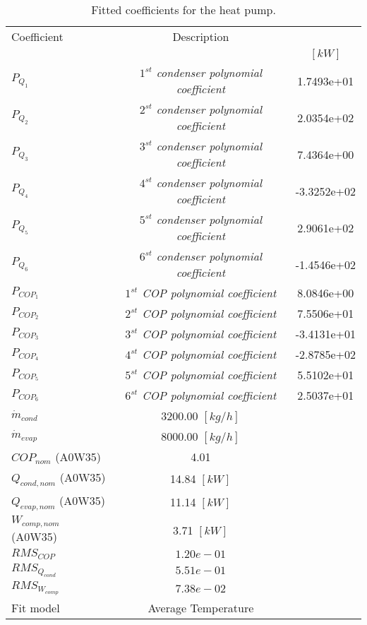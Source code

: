 \documentclass[english]{SPFShortReport}
\author{Dani Carbonell}
\begin{document}
\begin{table}[!ht]
\begin{small}
\caption{Fitted coefficients for the heat pump.}
\begin{center}
\resizebox{12cm}{!} 
{
\begin{tabular}{l | c c } 
\hline
\hline
Coefficient &Description & \\ 
 & &$[kW]$\\ 
\hline
$P_{Q_{1}}$ & \emph{$1^{st}$ condenser polynomial coefficient}  & 1.7493e+01    \\ 
$P_{Q_{2}}$ & \emph{$2^{st}$ condenser polynomial coefficient}  & 2.0354e+02    \\ 
$P_{Q_{3}}$ & \emph{$3^{st}$ condenser polynomial coefficient}  & 7.4364e+00    \\ 
$P_{Q_{4}}$ & \emph{$4^{st}$ condenser polynomial coefficient}  & -3.3252e+02    \\ 
$P_{Q_{5}}$ & \emph{$5^{st}$ condenser polynomial coefficient}  & 2.9061e+02    \\ 
$P_{Q_{6}}$ & \emph{$6^{st}$ condenser polynomial coefficient}  & -1.4546e+02    \\ 
\hline
$P_{COP_{1}}$ & \emph{$1^{st}$ COP polynomial coefficient}  & 8.0846e+00    \\ 
$P_{COP_{2}}$ & \emph{$2^{st}$ COP polynomial coefficient}  & 7.5506e+01    \\ 
$P_{COP_{3}}$ & \emph{$3^{st}$ COP polynomial coefficient}  & -3.4131e+01    \\ 
$P_{COP_{4}}$ & \emph{$4^{st}$ COP polynomial coefficient}  & -2.8785e+02    \\ 
$P_{COP_{5}}$ & \emph{$5^{st}$ COP polynomial coefficient}  & 5.5102e+01    \\ 
$P_{COP_{6}}$ & \emph{$6^{st}$ COP polynomial coefficient}  & 2.5037e+01    \\ 
\hline
$\dot m_{cond}$ & 3200.00 $[kg/h]$ \\ 
$\dot m_{evap}$ & 8000.00 $[kg/h]$ \\ 
\hline
$COP_{nom}$ (A0W35)& 4.01 \\ 
$Q_{cond,nom}$ (A0W35)& 14.84 $[kW]$\\ 
$Q_{evap,nom}$ (A0W35)& 11.14 $[kW]$\\ 
$W_{comp,nom}$ (A0W35)& 3.71 $[kW]$\\ 
\hline
 $RMS_{COP}$ & $1.20e-01$ \\ 
 $RMS_{Q_{cond}}$ & $5.51e-01$ \\ 
 $RMS_{W_{comp}}$ & $7.38e-02$ \\ 
\hline
Fit model & Average Temperature\\ 
\hline
\hline
\end{tabular}
}
\label{CoefTable}
\end{center}
\end{small}
\end{table}
\end{document}

